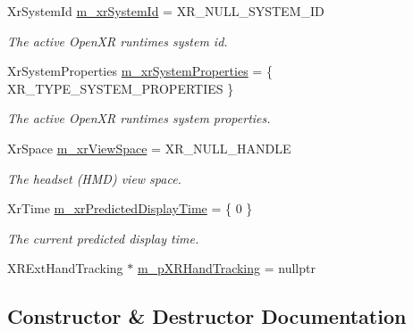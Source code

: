 \begin{DoxyCompactItemize}
Xr\+System\+Id \mbox{\hyperlink{class_open_x_r_provider_1_1_x_r_core_a06f937c343b02b36a3fb33ad6f38ffe4}{m\+\_\+xr\+System\+Id}} = X\+R\+\_\+\+N\+U\+L\+L\+\_\+\+S\+Y\+S\+T\+E\+M\+\_\+\+ID
\begin{DoxyCompactList}\small\item\em The active Open\+XR runtime\textquotesingle{}s system id. \end{DoxyCompactList}\item 
Xr\+System\+Properties \mbox{\hyperlink{class_open_x_r_provider_1_1_x_r_core_a7ce6c6f65d10afea312cb016b92754b6}{m\+\_\+xr\+System\+Properties}} = \{ X\+R\+\_\+\+T\+Y\+P\+E\+\_\+\+S\+Y\+S\+T\+E\+M\+\_\+\+P\+R\+O\+P\+E\+R\+T\+I\+ES \}
\begin{DoxyCompactList}\small\item\em The active Open\+XR runtime\textquotesingle{}s system properties. \end{DoxyCompactList}\item 
Xr\+Space \mbox{\hyperlink{class_open_x_r_provider_1_1_x_r_core_aedd9482e56c69a607c0c6aa8b0b2ab0b}{m\+\_\+xr\+View\+Space}} = X\+R\+\_\+\+N\+U\+L\+L\+\_\+\+H\+A\+N\+D\+LE
\begin{DoxyCompactList}\small\item\em The headset (H\+MD) view space. \end{DoxyCompactList}\item 
Xr\+Time \mbox{\hyperlink{class_open_x_r_provider_1_1_x_r_core_a566f650b5a09b9dbf55b18b7995b1577}{m\+\_\+xr\+Predicted\+Display\+Time}} = \{ 0 \}
\begin{DoxyCompactList}\small\item\em The current predicted display time. \end{DoxyCompactList}\item 
X\+R\+Ext\+Hand\+Tracking $\ast$ \mbox{\hyperlink{class_open_x_r_provider_1_1_x_r_core_af446de6c1cdd7c4bffa074b8ded9cae4}{m\+\_\+p\+X\+R\+Hand\+Tracking}} = nullptr
\end{DoxyCompactItemize}


\subsection{Constructor \& Destructor Documentation}
\mbox{\label{class_open_x_r_provider_1_1_x_r_core_ab74557f890dd3923a516bf6e34f45f5a}} 

